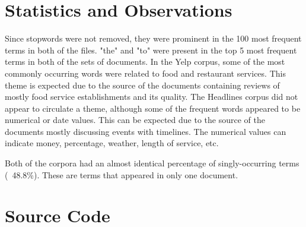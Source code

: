 \documentclass[11pt]{article}
\begin{document}
\section{Statistics and Observations}
Since stopwords were not removed, they were prominent in the 100 most frequent terms in both of the files. "the" and "to" were present in the top 5 most frequent terms in both of the sets of documents. In the Yelp corpus, some of the most commonly occurring words were related to food and restaurant services. This theme is expected due to the source of the documents containing reviews of mostly food service establishments and its quality. The Headlines corpus did not appear to circulate a theme, although some of the frequent words appeared to be numerical or date values. This can be expected due to the source of the documents mostly discussing events with timelines. The numerical values can indicate money, percentage, weather, length of service, etc.

Both of the corpora had an almost identical percentage of singly-occurring terms (~48.8\%). These are terms that appeared in only one document.

\appendix

\section{Source Code} \label{appendix:src}


\end{document}
